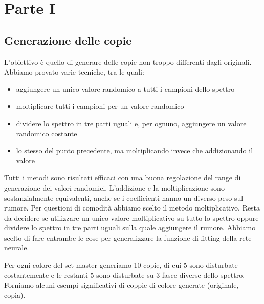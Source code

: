 \chapter{Parte I}

\section{Generazione delle copie}
L'obiettivo è quello di generare delle copie non troppo differenti dagli originali. Abbiamo provato varie tecniche, tra le quali:
\begin{itemize}
	\item aggiungere un unico valore randomico a tutti i campioni dello spettro
	\item moltiplicare tutti i campioni per un valore randomico
	\item dividere lo spettro in tre parti uguali e, per ognuno, aggiungere un valore randomico costante
	\item lo stesso del punto precedente, ma moltiplicando invece che addizionando il valore
\end{itemize}

Tutti i metodi sono risultati efficaci con una buona regolazione del range di generazione dei valori randomici. L'addizione e la moltiplicazione sono sostanzialmente equivalenti, anche se i coefficienti hanno un diverso peso sul rumore. Per questioni di comodità abbiamo scelto il metodo moltiplicativo. Resta da decidere se utilizzare un unico valore moltiplicativo su tutto lo spettro oppure dividere lo spettro in tre parti uguali sulla quale aggiungere il rumore. Abbiamo scelto di fare entrambe le cose per generalizzare la funzione di fitting della rete neurale.

Per ogni colore del set master generiamo 10 copie, di cui 5 sono disturbate costantemente e le restanti 5 sono disturbate su 3 fasce diverse dello spettro. Forniamo alcuni esempi significativi di coppie di colore generate (originale, copia).


